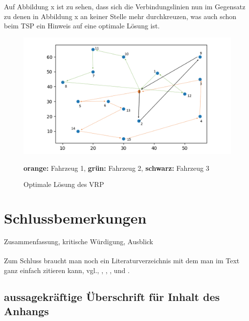 \documentclass[a4paper,12pt,parskip,bibtotoc,liststotoc]{article}
\begin{document}
Auf Abbildung x ist zu sehen, dass sich die Verbindungslinien nun im Gegensatz zu denen in Abbildung x an keiner Stelle mehr durchkreuzen, was auch schon beim TSP ein Hinweis auf eine optimale Lösung ist.

\begin{figure}[h!]
  \begin{center}
    \includegraphics[width=150mm]{vrpOpt52.png}
    \caption{Optimale Lösung des VRP}  \label{Typen}
	{\footnotesize \textbf{orange:} Fahrzeug 1, \textbf{grün:} Fahrzeug 2, \textbf{schwarz:} Fahrzeug 3}
  \end{center}
\end{figure}




\newpage




\section{Schlussbemerkungen}
Zusammenfassung, kritische Würdigung, Ausblick\\\\


Zum Schluss braucht man noch ein Literaturverzeichnis mit dem man im Text ganz einfach
zitieren kann, vgl.\cite{Det01}, \cite{OstSal04}, \cite{RieZimGla07}, \cite{SalPovNov08},
\cite{SchFlieBoy08} und \cite{ThaBosPet08}.

\newpage

\newpage
%
%
\begin{appendix}
\section{aussagekräftige Überschrift für Inhalt des Anhangs}

\end{appendix}
%
%
\end{document}
